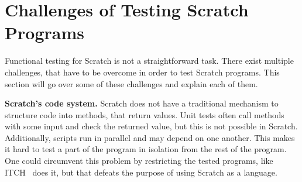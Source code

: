 %
%

\section{Challenges of Testing Scratch Programs}
\label{sec:challenges_of_testing_scratch_programs}

Functional testing for Scratch is not a straightforward task.
There exist multiple challenges, that have to be overcome in order to test Scratch programs.
This section will go over some of these challenges and explain each of them.
\parspace

\textbf{Scratch's code system.}
Scratch does not have a traditional mechanism to structure code into methods, that return values.
Unit tests often call methods with some input and check the returned value, but this is not possible in Scratch.
Additionally, scripts run in parallel and may depend on one another.
This makes it hard to test a part of the program in isolation from the rest of the program.
One could circumvent this problem by restricting the tested programs, like ITCH~\cite{itch} does it,
but that defeats the purpose of using Scratch as a language.
\parspace

